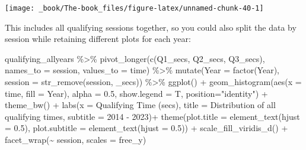 \documentclass[
]{book}
\newenvironment{Shaded}{\begin{snugshade}}{\end{snugshade}}
\newcommand{\AttributeTok}[1]{\textcolor[rgb]{0.77,0.63,0.00}{#1}}
\newcommand{\FloatTok}[1]{\textcolor[rgb]{0.00,0.00,0.81}{#1}}
\newcommand{\FunctionTok}[1]{\textcolor[rgb]{0.00,0.00,0.00}{#1}}
\newcommand{\NormalTok}[1]{#1}
\newcommand{\SpecialCharTok}[1]{\textcolor[rgb]{0.00,0.00,0.00}{#1}}
\newcommand{\StringTok}[1]{\textcolor[rgb]{0.31,0.60,0.02}{#1}}
\begin{document}
\begin{center}\texttt{[image: \_book/The-book\_files/figure-latex/unnamed-chunk-40-1]} \end{center}

This includes all qualifying sessions together, so you could also split the data by session while retaining different plots for each year:

\begin{Shaded}
\begin{Highlighting}[]
\NormalTok{qualifying\_allyears }\SpecialCharTok{\%\textgreater{}\%}
  \FunctionTok{pivot\_longer}\NormalTok{(}\FunctionTok{c}\NormalTok{(}\StringTok{\textquotesingle{}Q1\_secs\textquotesingle{}}\NormalTok{, }\StringTok{\textquotesingle{}Q2\_secs\textquotesingle{}}\NormalTok{, }\StringTok{\textquotesingle{}Q3\_secs\textquotesingle{}}\NormalTok{),}
               \AttributeTok{names\_to =} \StringTok{\textquotesingle{}session\textquotesingle{}}\NormalTok{,}
               \AttributeTok{values\_to =} \StringTok{\textquotesingle{}time\textquotesingle{}}\NormalTok{) }\SpecialCharTok{\%\textgreater{}\%}
  \FunctionTok{mutate}\NormalTok{(}\AttributeTok{Year =} \FunctionTok{factor}\NormalTok{(Year),}
         \AttributeTok{session =} \FunctionTok{str\_remove}\NormalTok{(session, }\StringTok{\textquotesingle{}\_secs\textquotesingle{}}\NormalTok{)) }\SpecialCharTok{\%\textgreater{}\%}
  \FunctionTok{ggplot}\NormalTok{() }\SpecialCharTok{+}
  \FunctionTok{geom\_histogram}\NormalTok{(}\FunctionTok{aes}\NormalTok{(}\AttributeTok{x =}\NormalTok{ time, }\AttributeTok{fill =}\NormalTok{ Year),}
                 \AttributeTok{alpha =} \FloatTok{0.5}\NormalTok{, }\AttributeTok{show.legend =}\NormalTok{ T,}
                 \AttributeTok{position=}\StringTok{"identity"}\NormalTok{) }\SpecialCharTok{+}
  \FunctionTok{theme\_bw}\NormalTok{() }\SpecialCharTok{+}
  \FunctionTok{labs}\NormalTok{(}\AttributeTok{x =} \StringTok{\textquotesingle{}Qualifying Time (secs)\textquotesingle{}}\NormalTok{,}
       \AttributeTok{title =} \StringTok{\textquotesingle{}Distribution of all qualifying times\textquotesingle{}}\NormalTok{,}
       \AttributeTok{subtitle =} \StringTok{\textquotesingle{}2014 {-} 2023\textquotesingle{}}\NormalTok{)}\SpecialCharTok{+}
  \FunctionTok{theme}\NormalTok{(}\AttributeTok{plot.title =} \FunctionTok{element\_text}\NormalTok{(}\AttributeTok{hjust =} \FloatTok{0.5}\NormalTok{),}
        \AttributeTok{plot.subtitle =} \FunctionTok{element\_text}\NormalTok{(}\AttributeTok{hjust =} \FloatTok{0.5}\NormalTok{)) }\SpecialCharTok{+}
  \FunctionTok{scale\_fill\_viridis\_d}\NormalTok{() }\SpecialCharTok{+}
  \FunctionTok{facet\_wrap}\NormalTok{(}\SpecialCharTok{\textasciitilde{}}\NormalTok{ session, }\AttributeTok{scales =} \StringTok{\textquotesingle{}free\_y\textquotesingle{}}\NormalTok{)}
\end{Highlighting}
\end{Shaded}
\end{document}
